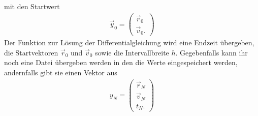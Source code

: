 mit den Startwert
\begin{align}
	\vec{y}_0=
	\begin{pmatrix}
		\vec{r}_0\\\vec{v}_0.
	\end{pmatrix}
\end{align}
Der Funktion zur Lösung der Differentialgleichung wird eine Endzeit übergeben, die Startvektoren $\vec{r}_0$ und $\vec{v}_0$ sowie die Intervallbreite $h$. Gegebenfalls kann ihr noch eine Datei übergeben werden in den die Werte eingespeichert werden, andernfalls gibt sie einen Vektor aus
\begin{align}
	y_N = 
	\begin{pmatrix}
		\vec{r}_N\\\vec{v}_N\\ t_N.
	\end{pmatrix}
\end{align}
